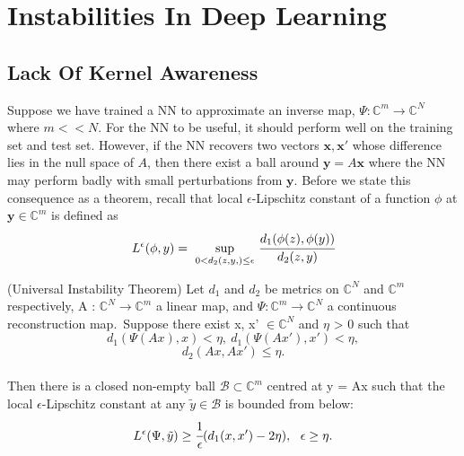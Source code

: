 \chapter{Instabilities In Deep Learning}

\section{Lack Of Kernel Awareness}


Suppose we have trained a NN to approximate an inverse map, $\Psi: \mathbb{C}^{m}\rightarrow  \mathbb{C}^{N}$ where $m << N$. For the NN to be useful, it should perform well on the training set and test set. However, if the NN recovers two vectors $\mathbf{x, x'}$  whose difference lies in the null space of $A$, then there exist a ball around $\mathbf{y}=A\mathbf{x}$ where the NN may perform badly with small perturbations from $\mathbf{y}$. Before we state this consequence as a theorem, recall that local $\epsilon$-Lipschitz constant of a function $\phi$ at $\mathbf{y} \in \mathbb{C}^{m}$ is defined as
\begin{equation*}
L^{\epsilon}(\phi,y) = \ \underset{0<d_{2}(z,y,)\leq \epsilon}{\text{sup}} \ \cfrac{d_1(\phi(z),\phi(y))}{d_2(z,y)}
\end{equation*}


\begin{theorem} (Universal Instability Theorem)
Let $d_1$ and $d_2$ be metrics on $\mathbb{C}^N$ and $\mathbb{C}^m$ respectively, A : $\mathbb{C}^{N}\rightarrow  \mathbb{C}^{m}$ a linear map, and $\Psi : \mathbb{C}^{m}\rightarrow  \mathbb{C}^{N}$ a continuous reconstruction map. Suppose there exist x, x' $\in \mathbb{C}^{N}$ and $\eta$ > 0 such that 
\begin{equation}
d_1(\Psi(Ax),x) < \eta , \ d_1(\Psi(Ax'),x') < \eta, 
\end{equation}
\begin{equation}
d_2(Ax,Ax') \leq \eta. 
\end{equation}
\\
Then there is a closed non-empty ball $\mathcal{B} \subset \mathbb{C}^m$ centred at y = Ax such that the local $\epsilon$-Lipschitz constant at any $\tilde{y} \in \mathcal{B}$ is bounded from below: 
\begin{equation}
L^{\epsilon}(\Psi,\tilde{y}) \geq \cfrac{1}{\epsilon}  (d_1(x,x') - 2\eta) , \ \ \epsilon \geq \eta. 
\end{equation}
\end{theorem}



